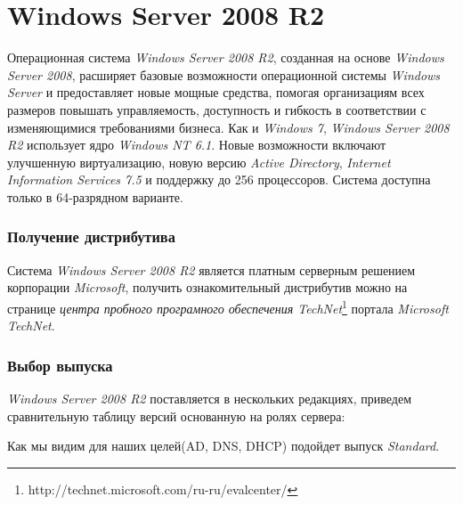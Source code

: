 \part{Windows Server 2008 R2}
Операционная система \textit{Windows Server 2008 R2}, созданная на основе \textit{Windows Server 2008}, расширяет базовые возможности операционной системы \textit{Windows Server} и предоставляет новые мощные средства, помогая организациям всех размеров повышать управляемость, доступность и гибкость в соответствии с изменяющимися требованиями бизнеса.
Как и \textit{Windows 7}, \textit{Windows Server 2008 R2} использует ядро \textit{Windows NT 6.1}.
Новые возможности включают улучшенную виртуализацию, новую версию \textit{Active Directory}, \textit{Internet Information Services 7.5} и поддержку до 256 процессоров. Система доступна только в 64-разрядном варианте.

\section{Получение дистрибутива}
Система \textit{Windows Server 2008 R2} является платным серверным решением корпорации \textit{Microsoft}, получить ознакомительный дистрибутив можно на странице \textit{центра пробного програмного обеспечения TechNet}\footnote{http://technet.microsoft.com/ru-ru/evalcenter/} портала \textit{Microsoft TechNet}.

\section{Выбор выпуска}
\textit{Windows Server 2008 R2} поставляется в нескольких редакциях, приведем сравнительную таблицу версий основанную на ролях сервера:
\begin{figure}[H]
\end{figure}
Как мы видим для наших целей(AD, DNS, DHCP) подойдет выпуск \textit{Standard}.
\newpage
